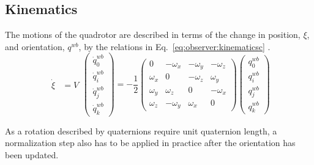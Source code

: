    \subsection{Kinematics}
        The motions of the quadrotor are described in terms of the change in position, $\xi$,
        and orientation, $q^{wb}$, by the relations in Eq.~\eqref{eq:observer:kinematicsc} \citep{Pounds_modellingand}. %
        \begin{subequations}
            \label{eq:observer:kinematicsc}
            \begin{align}
                \label{eq:observer:position}
                \dot{\xi} &= V
            \end{align}
            \begin{equation}
                \label{eq:observer:quaternionsc}
                \left(\begin{array}{c}
                    \dot{q}^{wb}_{0} \\
                    \dot{q}^{wb}_{i} \\
                    \dot{q}^{wb}_{j} \\
                    \dot{q}^{wb}_{k}
                \end{array}\right) = -\frac{1}{2}\left(\begin{array}{cccc}
                0 & -\omega_{x} & -\omega_{y} & -\omega_{z} \\
                \omega_{x} & 0 & -\omega_{z} & \omega_{y} \\
                \omega_{y} & \omega_{z} & 0 & -\omega_{x} \\
                \omega_{z} & -\omega_{y} & \omega_{x} & 0
                \end{array}\right)\left(\begin{array}{c}
                q^{wb}_{0} \\
                q^{wb}_{i} \\
                q^{wb}_{j} \\
                q^{wb}_{k}
                \end{array}\right)
            \end{equation}
        \end{subequations}

        As a rotation described by quaternions require unit quaternion length,
        a normalization step also has to be applied in practice after the
        orientation has been updated.


